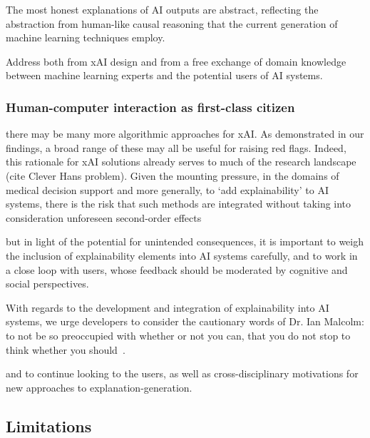 The most honest explanations of AI outputs are abstract, reflecting the abstraction from human-like causal reasoning that the current generation of machine learning techniques employ.

Address both from xAI design and from a free exchange of domain knowledge between machine learning experts and the potential users of AI systems. 

\subsubsection{Human-computer interaction as first-class citizen}

there may be many more algorithmic approaches for xAI. As demonstrated in our findings, a broad range of these may all be useful for raising red flags. Indeed, this rationale for xAI solutions already serves to much of the research landscape (cite Clever Hans problem). Given the mounting pressure, in the domains of medical decision support and more generally, to `add explainability' to AI systems, there is the risk that such methods are integrated without taking into consideration unforeseen second-order effects

but in light of the potential for unintended consequences, it is important to weigh the inclusion of explainability elements into AI systems carefully, and to work in a close loop with users, whose feedback should be moderated by cognitive and social perspectives. 

With regards to the development and integration of explainability into AI systems, we urge developers to consider the cautionary words of Dr. Ian Malcolm: to not be so preoccupied with whether or not you can, that you do not stop to think whether you should~\cite{crichton1991jurassic}.

and to continue looking to the users, as well as cross-disciplinary motivations for new approaches to explanation-generation.
  
\subsection{Limitations}


